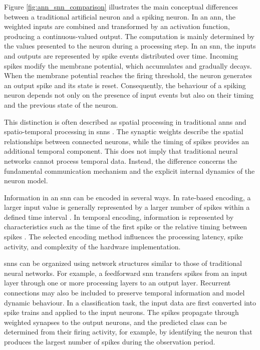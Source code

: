 Figure \ref{fig:ann_snn_comparison} illustrates the main conceptual differences between a traditional artificial neuron and a spiking neuron. In an \gls{ann}, the weighted inputs are combined and transformed by an activation function, producing a continuous-valued output. The computation is mainly determined by the values presented to the neuron during a processing step. In an \gls{snn}, the inputs and outputs are represented by spike events distributed over time. Incoming spikes modify the membrane potential, which accumulates and gradually decays. When the membrane potential reaches the firing threshold, the neuron generates an output spike and its state is reset. Consequently, the behaviour of a spiking neuron depends not only on the presence of input events but also on their timing and the previous state of the neuron.

This distinction is often described as spatial processing in traditional \gls{ann}s and spatio-temporal processing in \gls{snn}s \cite{Maass1997}. The synaptic weights describe the spatial relationships between connected neurons, while the timing of spikes provides an additional temporal component. This does not imply that traditional neural networks cannot process temporal data. Instead, the difference concerns the fundamental communication mechanism and the explicit internal dynamics of the neuron model.

Information in an \gls{snn} can be encoded in several ways. In rate-based encoding, a larger input value is generally represented by a larger number of spikes within a defined time interval \cite{Gerstner2014}. In temporal encoding, information is represented by characteristics such as the time of the first spike or the relative timing between spikes \cite{Thorpe2001}. The selected encoding method influences the processing latency, spike activity, and complexity of the hardware implementation.

\gls{snn}s can be organized using network structures similar to those of traditional neural networks. For example, a feedforward \gls{snn} transfers spikes from an input layer through one or more processing layers to an output layer. Recurrent connections may also be included to preserve temporal information and model dynamic behaviour. In a classification task, the input data are first converted into spike trains and applied to the input neurons. The spikes propagate through weighted synapses to the output neurons, and the predicted class can be determined from their firing activity, for example, by identifying the neuron that produces the largest number of spikes during the observation period.

